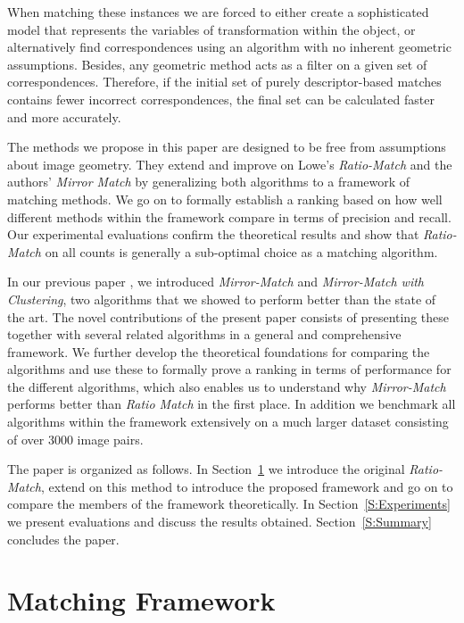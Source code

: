 \documentclass[review]{elsarticle}
\begin{document}
When matching these instances we are forced to either create a sophisticated model that represents the variables of transformation within the object, or alternatively find correspondences using an algorithm with no inherent geometric assumptions. Besides, any geometric method acts as a filter on a given set of correspondences.  Therefore, if the initial set of purely descriptor-based matches contains fewer incorrect correspondences, the final set can be calculated faster and more accurately.

The methods we propose in this paper are designed to be free from assumptions about image geometry. They extend and improve on Lowe's \emph{Ratio-Match} \cite{lowe2004sift} and the authors' \emph{Mirror Match} \cite{arnfred2013mirror} by generalizing both algorithms to a framework of matching methods. We go on to formally establish a ranking based on how well different methods within the framework compare in terms of precision and recall. Our experimental evaluations confirm the theoretical results and show that \emph{Ratio-Match} on all counts is generally a sub-optimal choice as a matching algorithm. 

In our previous paper \cite{arnfred2013mirror}, we introduced \emph{Mirror-Match} and \emph{Mirror-Match with Clustering}, two algorithms that we showed to perform better than the state of the art. The novel contributions of the present paper consists of presenting these together with several related algorithms in a general and comprehensive framework.  We further develop the theoretical foundations for comparing the algorithms and use these to formally prove a ranking in terms of performance for the different algorithms, which also enables us to understand why \emph{Mirror-Match} performs better than \emph{Ratio Match} in the first place.  In addition we benchmark all algorithms within the framework extensively on a much larger dataset consisting of over 3000 image pairs.

The paper is organized as follows. In Section~\ref{S:MatchingMethods} we introduce the original \emph{Ratio-Match}, extend on this method to introduce the proposed framework and go on to compare the members of the framework theoretically.  In Section~\ref{S:Experiments} we present evaluations and discuss the results obtained.  Section~\ref{S:Summary} concludes the paper.

\section{Matching Framework}
\label{S:MatchingMethods}
%
\end{document}
